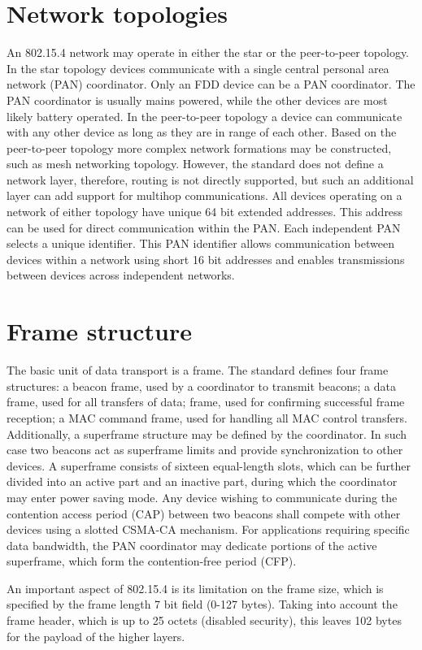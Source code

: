 \documentclass[12pt, titlepage, a4paper]{report}
\begin{document}
\section{Network topologies}
An 802.15.4 network may operate in either the star or the peer-to-peer topology. In the star topology devices communicate with a single central personal area network (PAN) coordinator. Only an FDD device can be a PAN coordinator. The PAN coordinator is usually mains powered, while the other devices are most likely battery operated. In the peer-to-peer topology a device can communicate with any other device as long as they are in range of each other. Based on the peer-to-peer topology more complex network formations may be constructed, such as mesh networking topology. However, the standard does not define a network layer, therefore, routing is not directly supported, but such an additional layer can add support for multihop communications. All devices operating on a network of either topology have unique 64 bit extended addresses. This address can be used for direct communication within the PAN. Each independent PAN selects a unique identifier. This PAN identifier allows communication between
devices within a network using short 16 bit addresses and enables transmissions between devices across independent networks.

\section{Frame structure}
The basic unit of data transport is a frame. The standard defines four frame structures: a beacon frame, used by a coordinator to transmit beacons; a data frame, used for all transfers of data;  frame, used for confirming successful frame reception; a MAC command frame, used for handling all MAC control transfers. Additionally, a superframe structure may be defined by the coordinator. In such case two beacons act as superframe limits and provide synchronization to other devices. A superframe consists of sixteen equal-length slots, which can be further divided into an active part and an inactive part, during which the coordinator may enter power saving mode. Any device wishing to communicate during the contention access period (CAP) between two beacons shall compete with other devices using a slotted CSMA-CA mechanism. For applications requiring specific data bandwidth, the PAN coordinator may dedicate portions of the active superframe, which form the contention-free period (CFP).

An important aspect of 802.15.4 is its limitation on the frame size, which is specified by the frame length 7 bit field (0-127 bytes). Taking into account the frame header, which is up to 25 octets (disabled security), this leaves 102 bytes for the payload of the higher layers.
\end{document}
